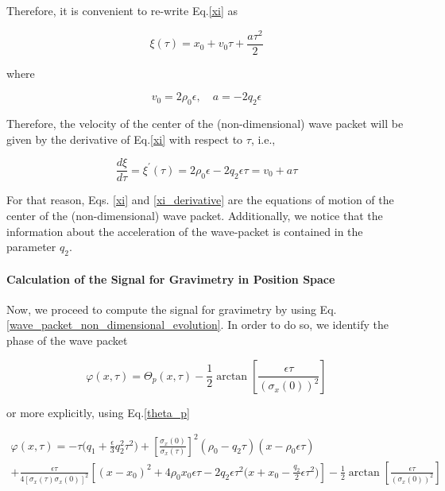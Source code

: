 \documentclass{article}
\begin{document}
Therefore, it is convenient to re-write Eq.\ref{xi} as

\begin{equation}\label{xi_eq_motion}
\xi(\tau) = x_{0} + v_{0} \tau + \frac{a \tau^{2}}{2}
\end{equation}

where 

\begin{equation}\label{xi_defs_eq_motion}
v_{0} = 2\rho_{0} \epsilon \mathrm{,}\quad a = -2 q_{2} \epsilon
\end{equation}

Therefore, the velocity of the center of the (non-dimensional) wave packet will be given by the derivative of Eq.\ref{xi} with respect to $\tau$, i.e.,

\begin{equation}\label{xi_derivative}
\frac{d\xi}{d\tau} = \xi^{\prime}(\tau) =  2 \rho_{0} \epsilon - 2 q_{2}\epsilon \tau = v_{0} + a \tau
\end{equation}

For that reason, Eqs. \ref{xi} and \ref{xi_derivative} are the equations of motion of the center of the (non-dimensional) wave packet. Additionally, we notice that the information about the acceleration of the wave-packet is contained in the parameter $q_{2}$.

\paragraph{Calculation of the Signal for Gravimetry in Position Space}

Now, we proceed to compute the signal for gravimetry by using Eq.\ref{wave_packet_non_dimensional_evolution}. In order to do so, we identify the phase of the wave packet

\begin{equation}
\varphi(x, \tau) = \Theta_{p}(x, \tau) - \frac{1}{2}\arctan\left[\frac{\epsilon \tau}{(\sigma_{x}(0))^{2}}\right]
\end{equation}

or more explicitly, using Eq.\ref{theta_p}

\begin{multline}\label{quantum_phase}
\varphi(x, \tau) = -\tau \bigg(q_{1} + \frac{\epsilon}{3} q_{2}^{2} \tau^{2}\bigg) + \left[\frac{\sigma_{x}(0)}{\sigma_{x}(\tau)} \right]^{2} (\rho_{0} - q_{2} \tau)(x-\rho_{0} \epsilon \tau) \\
+ \frac{\epsilon \tau}{4 [\sigma_{x}(\tau)\sigma_{x}(0)]^{2}} \left[(x-x_{0})^{2} + 4\rho_{0} x_{0} \epsilon \tau -2q_{2} \epsilon \tau^{2} \bigg(x+x_{0}- \frac{q_{2}}{2} \epsilon \tau^{2} \bigg)\right] 
- \frac{1}{2}\arctan\left[\frac{\epsilon \tau}{(\sigma_{x}(0))^{2}}\right]
\end{multline}
\end{document}
